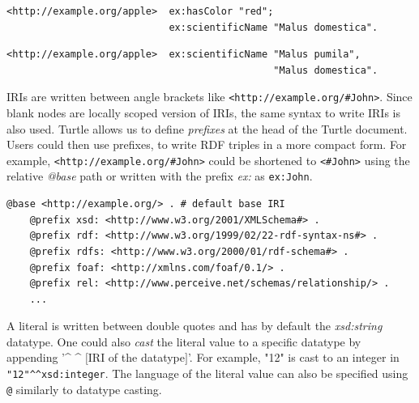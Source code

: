 \begin{lstlisting}[label={lst:same_subject}, 
    caption={Usage of ';' where triples share the same subject.}]
<http://example.org/apple>  ex:hasColor "red";
                            ex:scientificName "Malus domestica".
\end{lstlisting}

\begin{lstlisting}[label={lst:different_object}, 
    caption={Usage of ',' where triples differs only in the objects.}]
<http://example.org/apple>  ex:scientificName "Malus pumila", 
                                              "Malus domestica".
\end{lstlisting}


IRIs are written between angle brackets like \lstinline{<http://example.org/#John>}.
Since blank nodes are locally scoped version of IRIs, the same syntax to write IRIs is also used.
Turtle allows us to define \textit{prefixes} at the head of the Turtle document.
Users could then use prefixes, to write RDF triples in a more compact form. For example,
\lstinline{<http://example.org/#John>} could be shortened to
\lstinline{<#John>} using the relative \textit{@base} path or written with the prefix \emph{ex:} as 
\lstinline{ex:John}.

\begin{lstlisting}[caption={Prefixes in Turtle syntax.}, float]
    @base <http://example.org/> . # default base IRI
    @prefix xsd: <http://www.w3.org/2001/XMLSchema#> .
    @prefix rdf: <http://www.w3.org/1999/02/22-rdf-syntax-ns#> .
    @prefix rdfs: <http://www.w3.org/2000/01/rdf-schema#> .
    @prefix foaf: <http://xmlns.com/foaf/0.1/> .
    @prefix rel: <http://www.perceive.net/schemas/relationship/> . 
    ... 
\end{lstlisting}

A literal is written between double quotes and has by
default the \emph{xsd:string} datatype. 
One could also \textit{cast} the literal value to a specific datatype 
by appending '\textasciicircum{} \textasciicircum{} $[$IRI of the datatype$]$'. For example, 
"12" is cast to an integer in \lstinline{"12"^^xsd:integer}.
The language of the literal value 
can also be specified using \lstinline{@} similarly to datatype casting. 

